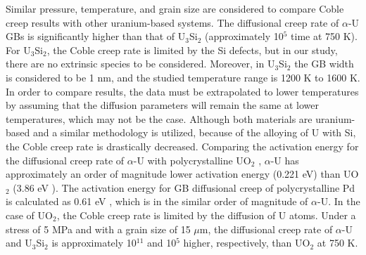 \documentclass[review]{elsarticle}
\begin{document}
Similar pressure, temperature, and grain size are considered to compare Coble creep results with other uranium-based systems. The diffusional creep rate of $\alpha$-U GBs is significantly higher than that of U$_\mathrm{3}$Si$_\mathrm{2}$ (approximately 10$^{5}$ time at 750 K). For U$_\mathrm{3}$Si$_\mathrm{2}$, the Coble creep rate is limited by the Si defects, but in our study, there are no extrinsic species to be considered. Moreover, in U$_\mathrm{3}$Si$_\mathrm{2}$ \cite{COOPER2021153129} the GB width is considered to be 1 nm, and the studied temperature range is 1200 K to 1600 K. In order to compare results, the data must be extrapolated to lower temperatures by assuming that the diffusion parameters will remain the same at lower temperatures, which may not be the case. Although both materials are uranium-based and a similar methodology is utilized, because of the alloying of U with Si, the Coble creep rate is drastically decreased. Comparing the activation energy for the diffusional creep rate of $\alpha$-U with polycrystalline UO$_\mathrm{2}$ \cite{DESAI20084489}, $\alpha$-U has approximately an order of magnitude lower activation energy (0.221 eV) than UO$_\mathrm{2}$ (3.86 eV \cite{DESAI20084489}). The activation energy for GB diffusional creep of polycrystalline Pd is calculated as 0.61 eV \cite{YAMAKOV200261_Pd_creep}, which is in the similar order of magnitude of $\alpha$-U. In the case of UO$_2$, the Coble creep rate is limited by the diffusion of U atoms. Under a stress of 5 MPa and with a grain size of 15 $\mu$m, the diffusional creep rate of $\alpha$-U and U$_\mathrm{3}$Si$_\mathrm{2}$ is approximately 10$^{11}$ and 10$^{5}$ higher, respectively, than UO$_\mathrm{2}$ at 750 K.  
\end{document}
